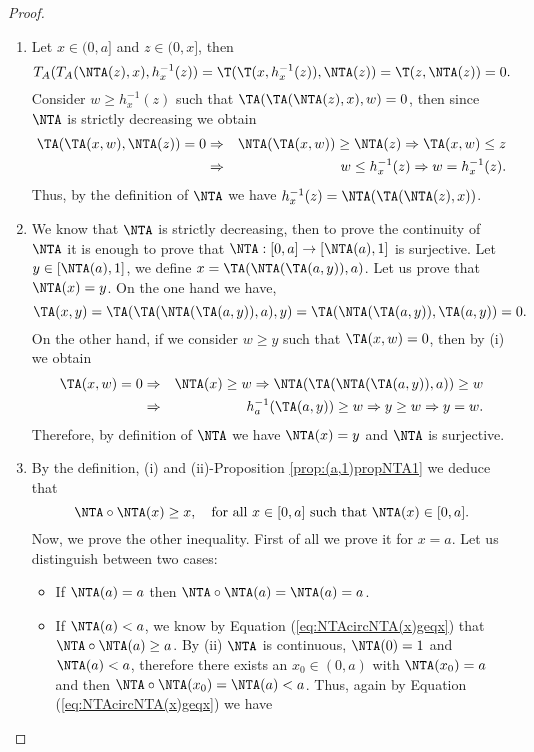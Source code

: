 \begin{proof}
	\begin{enumerate}[label=(\roman*)]
		\item Let $x \in (0,a]$ and $z \in (0,x]$, then
		$$T_A(T_A(\NTA(z),x),h_x^{-1}(z))=\T(\T(x,h_x^{-1}(z)),\NTA(z))=\T(z,\NTA(z))=0.$$
		Consider $w \geq h_x^{-1}(z)$ such that $\TA(\TA(\NTA(z),x),w)=0$, then since $\NTA$ is strictly decreasing we obtain
		\begin{eqnarray*}
		\TA(\TA(x,w),\NTA(z))=0 &\Rightarrow& \NTA(\TA(x,w)) \geq \NTA(z) \Rightarrow \TA(x,w)\leq z \\
		& \Rightarrow & w \leq h_x^{-1}(z) \Rightarrow w = h_x^{-1}(z).
		\end{eqnarray*}
		Thus, by the definition of $\NTA$ we have $h_x^{-1}(z)=\NTA(\TA(\NTA(z),x))$.			
		\item We know that $\NTA$ is strictly decreasing, then to prove the continuity of $\NTA$ it is enough to prove that $\NTA:[0,a] \to [\NTA(a),1]$ is surjective. Let $y \in [\NTA(a),1]$, we define $x=\TA(\NTA(\TA(a,y)),a)$. Let us prove that $\NTA(x)=y$. On the one hand we have,
		$$\TA(x,y)=\TA(\TA(\NTA(\TA(a,y)),a),y)=\TA(\NTA(\TA(a,y)),\TA(a,y))=0.$$
		On the other hand, if we consider $w \geq y$ such that $\TA(x,w)=0$, then by (i) we obtain
		\begin{eqnarray*}
		\TA(x,w)=0 & \Rightarrow & \NTA(x) \geq w \Rightarrow \NTA(\TA(\NTA(\TA(a,y)),a)) \geq w \\
		& \Rightarrow & h_a^{-1}(\TA(a,y)) \geq w \Rightarrow y \geq w \Rightarrow y=w.
		\end{eqnarray*}
		Therefore, by definition of $\NTA$ we have $\NTA(x)=y$ and $\NTA$ is surjective.
		\item By the definition, (i) and (ii)-Proposition \ref{prop:(a,1)propNTA1} we deduce that
		\begin{equation}
			\NTA \circ \NTA(x) \geq x, \quad \text{for all } x \in [0,a]  \text{ such that } \NTA(x) \in [0,a].
			\label{eq:NTAcircNTA(x)geqx}
		\end{equation}
		Now, we prove the other inequality. First of all we prove it for $x=a$. Let us distinguish between two cases:
		\begin{itemize}
			\item If $\NTA(a)=a$ then $\NTA \circ \NTA (a)= \NTA(a)=a$.
			\item If $\NTA(a) < a$, we know by Equation (\ref{eq:NTAcircNTA(x)geqx})  that $\NTA \circ \NTA(a) \geq a$. By (ii) $\NTA$ is continuous, $\NTA(0)=1$ and $\NTA(a)<a$, therefore there exists an $x_0 \in (0,a)$ with $\NTA(x_0)=a$ and then $\NTA \circ \NTA(x_0)=\NTA(a)<a$. Thus, again by Equation (\ref{eq:NTAcircNTA(x)geqx}) we have

\end{itemize}
\end{enumerate}
\end{proof}
